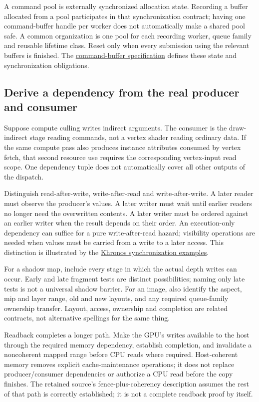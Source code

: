 A command pool is externally synchronized allocation state. Recording a buffer allocated from a pool participates in that synchronization contract; having one command-buffer handle per worker does not automatically make a shared pool safe. A common organization is one pool for each recording worker, queue family and reusable lifetime class. Reset only when every submission using the relevant buffers is finished. The \href{https://docs.vulkan.org/spec/latest/chapters/cmdbuffers.html}{command-buffer specification} defines these state and synchronization obligations.

\subsection{Derive a dependency from the real producer and consumer}\label{01-foundations-i-ch011-derive-a-dependency-from-the-real-producer-and-consumer}

Suppose compute culling writes indirect arguments. The consumer is the draw-indirect stage reading commands, not a vertex shader reading ordinary data. If the same compute pass also produces instance attributes consumed by vertex fetch, that second resource use requires the corresponding vertex-input read scope. One dependency tuple does not automatically cover all other outputs of the dispatch.

Distinguish read-after-write, write-after-read and write-after-write. A later reader must observe the producer's values. A later writer must wait until earlier readers no longer need the overwritten contents. A later writer must be ordered against an earlier writer when the result depends on their order. An execution-only dependency can suffice for a pure write-after-read hazard; visibility operations are needed when values must be carried from a write to a later access. This distinction is illustrated by the \href{https://docs.vulkan.org/guide/latest/synchronization_examples.html}{Khronos synchronization examples}.

For a shadow map, include every stage in which the actual depth writes can occur. Early and late fragment tests are distinct possibilities; naming only late tests is not a universal shadow barrier. For an image, also identify the aspect, mip and layer range, old and new layouts, and any required queue-family ownership transfer. Layout, access, ownership and completion are related contracts, not alternative spellings for the same thing.

Readback completes a longer path. Make the GPU's writes available to the host through the required memory dependency, establish completion, and invalidate a noncoherent mapped range before CPU reads where required. Host-coherent memory removes explicit cache-maintenance operations; it does not replace producer/consumer dependencies or authorize a CPU read before the copy finishes. The retained source's fence-plus-coherency description assumes the rest of that path is correctly established; it is not a complete readback proof by itself.

